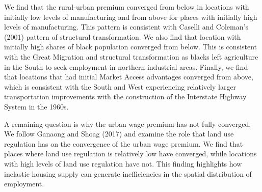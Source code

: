 \documentclass[12pt,twoside]{article}
\begin{document}
We find that the rural-urban premium converged from below in locations with initially low levels of manufacturing and from above for places with initially high levels of manufacturing. 
This pattern is consistent with Caselli and Coleman's (2001) pattern of structural transformation. 
We also find that location with initially high shares of black population converged from below. 
This is consistent with the Great Migration and structural transformation as blacks left agriculture in the South to seek employment in northern industrial areas. 
Finally, we find that locations that had initial Market Access advantages converged from above, which is consistent with the South and West experiencing relatively larger transportation improvements with the construction of the Interstate Highway System in the 1960s. 

A remaining question is why the urban wage premium has not fully converged. 
We follow Ganaong and Shoag (2017) and examine the role that land use regulation has on the convergence of the urban wage premium. 
We find that places where land use regulation is relatively low have converged, while locations with high levels of land use regulation have not.
This finding highlights how inelastic housing supply can generate inefficiencies in the spatial distribution of employment.   




  
\end{document}
